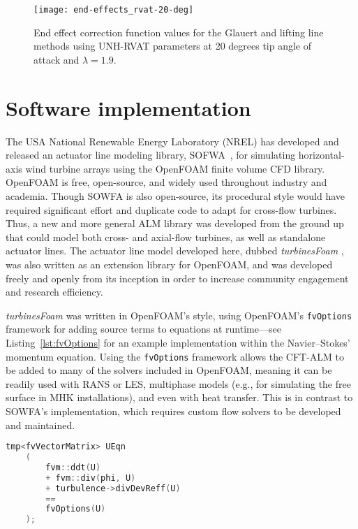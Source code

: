 \begin{figure}
    \centering

    \texttt{[image: end-effects\_rvat-20-deg]}

    \caption{End effect correction function values for the Glauert and lifting
        line methods using UNH-RVAT parameters at 20 degrees tip angle of attack and
        $\lambda=1.9$.}

    \label{fig:end-effects}
\end{figure}


\section{Software implementation}

The USA National Renewable Energy Laboratory (NREL) has developed and released
an actuator line modeling library, SOFWA~\cite{Churchfield2014b}, for simulating
horizontal-axis wind turbine arrays using the OpenFOAM finite volume CFD
library. OpenFOAM is free, open-source, and widely used throughout industry and
academia. Though SOWFA is also open-source, its procedural style would have
required significant effort and duplicate code to adapt for cross-flow turbines.
Thus, a new and more general ALM library was developed from the ground up that
could model both cross- and axial-flow turbines, as well as standalone actuator
lines. The actuator line model developed here, dubbed \textit{turbinesFoam}
\cite{Bachant2016-turbinesFoam}, was also written as an extension library for
OpenFOAM, and was developed freely and openly from its inception in order to
increase community engagement and research efficiency.

\textit{turbinesFoam} was written in OpenFOAM's style, using OpenFOAM's
\texttt{fvOptions} framework for adding source terms to equations at
runtime---see Listing~\ref{lst:fvOptions} for an example implementation within
the Navier--Stokes' momentum equation. Using the \texttt{fvOptions} framework
allows the CFT-ALM to be added to many of the solvers included in OpenFOAM,
meaning it can be readily used with RANS or LES, multiphase models (e.g., for
simulating the free surface in MHK installations), and even with heat transfer.
This is in contrast to SOWFA's implementation, which requires custom flow
solvers to be developed and maintained.

\begin{lstlisting}[float,language=C++,caption=Adding source terms to the momentum equation in OpenFOAM.,label=lst:fvOptions]
    tmp<fvVectorMatrix> UEqn
    (
        fvm::ddt(U)
        + fvm::div(phi, U)
        + turbulence->divDevReff(U)
        ==
        fvOptions(U)
    );
\end{lstlisting}

